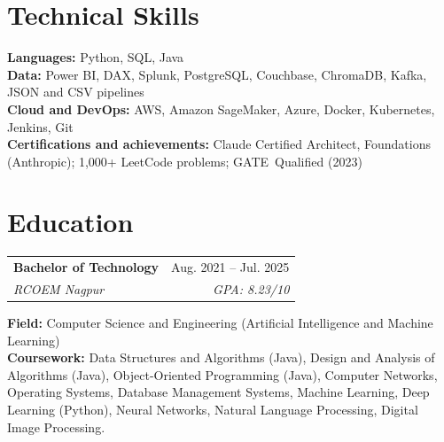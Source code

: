 \documentclass[a4paper,11pt]{article}
\begin{document}
\section{Technical Skills}
\small\textbf{Languages:} Python, SQL, Java \\
\textbf{Data:} Power BI, DAX, Splunk, PostgreSQL, Couchbase, ChromaDB, Kafka, JSON and CSV pipelines \\
\textbf{Cloud and DevOps:} AWS, Amazon SageMaker, Azure, Docker, Kubernetes, Jenkins, Git \\
\textbf{Certif{}ications and achievements:} Claude \mbox{Certif{}ied} Architect, Foundations (Anthropic); 1,000+ LeetCode problems; \mbox{GATE Qualif{}ied} (2023)

\section{Education}
\begin{tabularx}{\textwidth}{@{}Xr@{}}
  \textbf{Bachelor of Technology} & Aug. 2021 -- Jul. 2025 \\
  \textit{\small RCOEM Nagpur} & \textit{\small GPA: 8.23/10} \\
\end{tabularx}
\small\textbf{Field:} Computer Science and Engineering (Artif{}icial Intelligence and Machine Learning)\\
\small\textbf{Coursework:} Data Structures and Algorithms (Java), Design and Analysis of Algorithms (Java), Object-Oriented Programming (Java), Computer Networks, Operating Systems, Database Management Systems, Machine Learning, Deep Learning (Python), Neural Networks, Natural Language Processing, Digital Image Processing.
\end{document}
